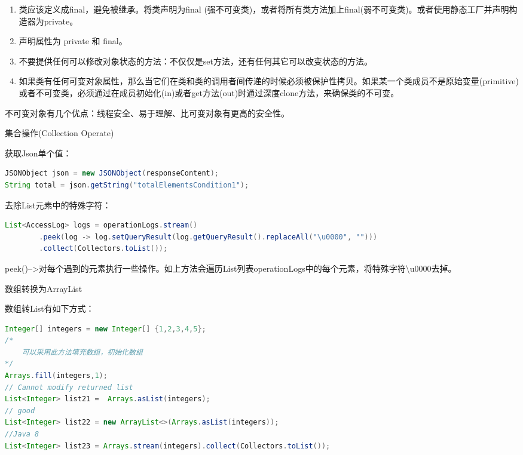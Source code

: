 \documentclass[12pt]{book}
\makeatletter
\numberwithin{dummy}{section}
\theoremstyle{ocrenumbox}
\theoremstyle{blacknumex}
\theoremstyle{blacknumbox}
\theoremstyle{ocrenum}
\renewcommand{\subsection}{\@startsection {subsection}{2}{\z@}
	{-3ex \@plus -0.1ex \@minus -.4ex}
	{0.5ex \@plus.2ex }
	{\normalfont\sffamily\bfseries}}
\renewcommand\paragraph{\@startsection{paragraph}{4}{\z@}
	{-2ex \@plus-.2ex \@minus .2ex}
	{.1ex}
	{\normalfont\small\sffamily\bfseries}}
\newlength\esp
\makeatother
\begin{document}
\begin{enumerate}
	\item{类应该定义成final，避免被继承。将类声明为final (强不可变类)，或者将所有类方法加上final(弱不可变类)。或者使用静态工厂并声明构造器为private。}
	\item{声明属性为 private 和 final。}
	\item {不要提供任何可以修改对象状态的方法：不仅仅是set方法，还有任何其它可以改变状态的方法。}
	\item {如果类有任何可变对象属性，那么当它们在类和类的调用者间传递的时候必须被保护性拷贝。如果某一个类成员不是原始变量(primitive)或者不可变类，必须通过在成员初始化(in)或者get方法(out)时通过深度clone方法，来确保类的不可变。}
\end{enumerate}

不可变对象有几个优点：线程安全、易于理解、比可变对象有更高的安全性。


\subsection{集合操作(Collection Operate)}

获取Json单个值：

\begin{lstlisting}[language=Java]
JSONObject json = new JSONObject(responseContent);
String total = json.getString("totalElementsCondition1");
\end{lstlisting}

去除List元素中的特殊字符：

\begin{lstlisting}[language=Java]
List<AccessLog> logs = operationLogs.stream()
		.peek(log -> log.setQueryResult(log.getQueryResult().replaceAll("\u0000", "")))
		.collect(Collectors.toList());
\end{lstlisting}

peek()-->对每个遇到的元素执行一些操作。如上方法会遍历List列表operationLogs中的每个元素，将特殊字符\textbackslash u0000去掉。

\paragraph{数组转换为ArrayList}

数组转List有如下方式：

\begin{lstlisting}[language=Java]
Integer[] integers = new Integer[] {1,2,3,4,5};
/*
	可以采用此方法填充数组，初始化数组
*/
Arrays.fill(integers,1);
// Cannot modify returned list
List<Integer> list21 =  Arrays.asList(integers); 
// good
List<Integer> list22 = new ArrayList<>(Arrays.asList(integers)); 
//Java 8
List<Integer> list23 = Arrays.stream(integers).collect(Collectors.toList()); 
\end{lstlisting}
\end{document}
